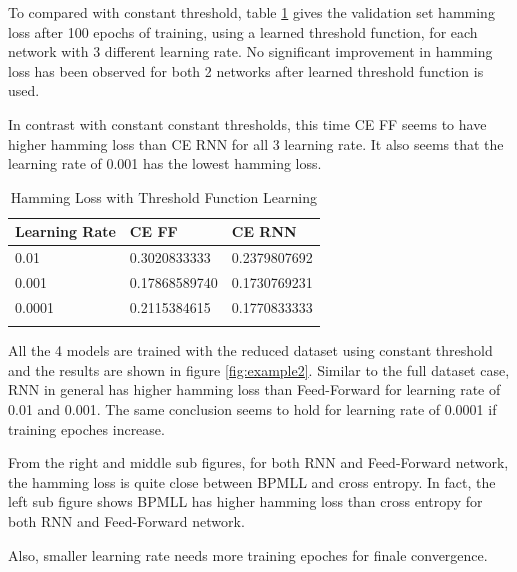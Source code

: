 \documentclass[11pt]{article}
\begin{document}
To compared with constant threshold, table \ref{PVFTD} gives the validation set hamming loss after 100 epochs of training, using a learned threshold function, for each network with 3 different learning rate. No significant improvement in hamming loss has been observed for both 2 networks after learned threshold function is used.

In contrast with constant constant thresholds, this time CE FF seems to have higher hamming loss than CE RNN for all 3 learning rate. It also seems that the learning rate of 0.001 has the lowest hamming loss.

 \begin{longtable}[c]{| p{} | p{} |p{} |}
\hline
        Learning Rate  & CE FF & CE RNN  \\
        \hline
         0.01 & 0.3020833333 & 0.2379807692 \\
        \hline
         0.001 & 0.17868589740 & 0.1730769231 \\
        \hline
         0.0001 & 0.2115384615 & 0.1770833333 \\
        \hline        
\caption{Hamming Loss with Threshold Function Learning}
\label{PVFTD}
\end{longtable}

All the 4 models are trained with the reduced dataset using constant threshold and the results are shown in figure \ref{fig:example2}. Similar to the full dataset case, RNN in general has higher hamming loss than Feed-Forward for learning rate of 0.01 and 0.001. The same conclusion seems to hold for learning rate of 0.0001 if training epoches increase. 

From the right and middle sub figures, for both RNN and Feed-Forward network, the hamming loss is quite close between BPMLL and cross entropy. In fact, the left sub figure shows BPMLL has higher hamming loss than cross entropy for both RNN and Feed-Forward network.

Also, smaller learning rate needs more training epoches for finale convergence. 
\end{document}
